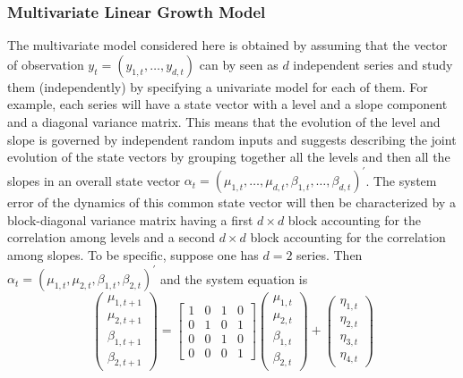\documentclass{article}
\begin{document}
\subsubsection{Multivariate Linear Growth Model}

The multivariate model considered here is obtained by assuming that the vector of observation
$y_t=(y_{1,t},\dots,y_{d,t})$ can by seen as $d$ independent series and study them
(independently) by specifying a univariate model for each of them. For example, each series
will have a state vector with a level and a slope component and a diagonal variance
matrix. This means that the evolution of the level and slope is governed by independent
random inputs and suggests describing the joint evolution of the state vectors by grouping
together all the levels and then all the slopes in an overall state vector
$\alpha_t = (\mu_{1,t},\dots, \mu_{d,t}, \beta_{1,t},\dots, \beta_{d,t})^{\prime}$. The
system error of the dynamics of this common state vector will then be characterized by a
block-diagonal variance matrix having a first $d \times d$ block accounting for the
correlation among levels and a second $d \times d$ block accounting for the correlation among
slopes. To be specific, suppose one has $d = 2$ series. Then
$\alpha_t = (\mu_{1,t}, \mu_{2,t}, \beta_{1,t}, \beta_{2,t})^{\prime} $ and the system
equation is
\begin{equation}
  \begin{pmatrix}
    \mu_{1,t+1}\\
    \mu_{2,t+1} \\
    \beta_{1,t+1}\\
    \beta_{2,t+1}
  \end{pmatrix}
  =
  \begin{bmatrix}
    1 & 0 & 1 & 0 \\
    0 & 1 & 0 & 1 \\
    0 & 0 & 1 & 0 \\
    0 & 0 & 0 & 1
  \end{bmatrix}
  \begin{pmatrix}
    \mu_{1,t}\\
    \mu_{2,t} \\
    \beta_{1,t}\\
    \beta_{2,t}
  \end{pmatrix}
  +
  \begin{pmatrix}
    \eta_{1,t}\\
    \eta_{2,t}\\
    \eta_{3,t}\\
    \eta_{4,t}
  \end{pmatrix}
  \label{eq:LinearGrowthState}
\end{equation}
\end{document}
